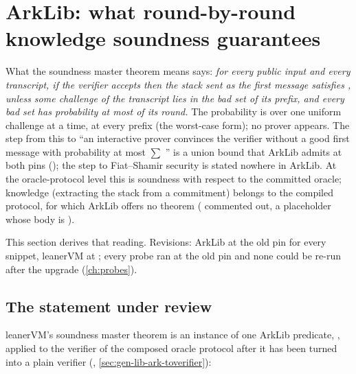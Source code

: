 \begingroup\sloppy
\section{ArkLib: what round-by-round knowledge soundness guarantees}\label{sec:gen-lib-ark-sec}

\begin{define}{What the soundness master theorem means}
 says: \emph{for every public input and every transcript, if the
verifier accepts then the stack sent as the first message satisfies , unless some
challenge of the transcript lies in the bad set of its prefix, and every bad set has probability
at most  of its round.} The probability is over one uniform challenge at a time,
at every prefix (the worst-case form); no prover appears. The step from this to \enquote{an
interactive prover convinces the verifier without a good first message with probability at most
$\sum$ } is a union bound that ArkLib admits at both pins
(\allowbreak{}\allowbreak{}); the step to Fiat--Shamir security is
stated nowhere in ArkLib. At the oracle-protocol level this is soundness with respect to the
committed oracle; knowledge (extracting the stack from a commitment) belongs to the compiled
protocol, for which ArkLib offers no theorem ( commented out,
 a placeholder whose body is ).
\end{define}

This section derives that reading. Revisions: ArkLib at the old pin  for every
snippet, leanerVM at ; every probe ran at the old pin and none could be re-run after
the upgrade (\cref{ch:probes}).

\subsection{The statement under review}\label{sec:gen-lib-ark-statement}

leanerVM's soundness master theorem is an instance of one ArkLib predicate,
\allowbreak{}, applied to the verifier of the composed oracle
protocol after it has been turned into a plain verifier (,
\cref{sec:gen-lib-ark-toverifier}):


